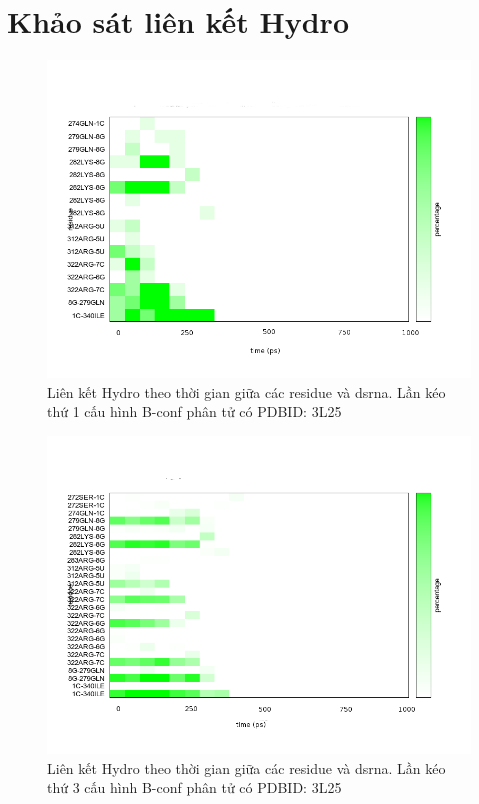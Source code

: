 \chapter{Khảo sát liên kết Hydro}
\label{hbond}
\begin{figure}[h!]
\includegraphics[width=\textwidth,natwidth=610,natheight=642]{hbond3L25_pull1}
\caption{Liên kết Hydro theo thời gian giữa các \gls{residue} và \gls{dsrna}. Lần kéo thứ 1 cấu hình B-conf phân tử có PDBID: 3L25}
\label{fig:hbond3L25_pull1}
\end{figure}
\begin{figure}[h!]
\includegraphics[width=\textwidth,natwidth=610,natheight=642]{hbond3L25_pull3}
\caption{Liên kết Hydro theo thời gian giữa các \gls{residue} và \gls{dsrna}. Lần kéo thứ 3 cấu hình B-conf phân tử có PDBID: 3L25}
\label{fig:hbond3L25_pull3}
\end{figure}